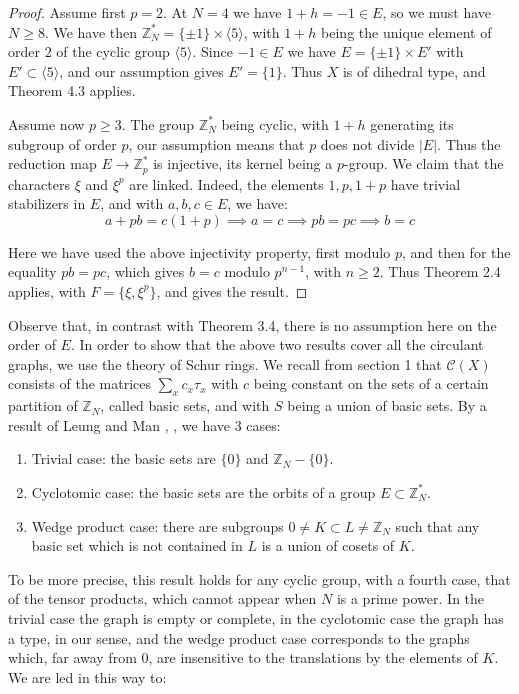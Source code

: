 \documentclass[11pt]{amsart}
\newcommand{\C}{\mathcal C}
\newcommand{\Z}{\mathbb Z}
\begin{document}
\begin{proof}
Assume first $p=2$. At $N=4$ we have $1+h=-1\in E$, so we must have $N\geq8$. We have then $\Z_N^*=\{\pm1\}\times\langle5\rangle$, with $1+h$ being the unique element of order $2$ of the cyclic group $\langle5\rangle$. Since $-1\in E$ we have $E=\{\pm1\}\times E'$ with $E'\subset\langle5\rangle$, and our assumption gives $E'=\{1\}$. Thus $X$ is of dihedral type, and Theorem 4.3 applies.

Assume now $p\geq3$. The group $\Z_N^*$ being cyclic, with $1+h$ generating its subgroup of order $p$, our assumption means that $p$ does not divide $|E|$. Thus the reduction map $E\to\Z_p^*$ is injective, its kernel being a $p$-group. We claim that the characters $\xi$ and $\xi^p$ are linked. Indeed, the elements $1,p,1+p$ have trivial stabilizers in $E$, and with $a,b,c\in E$, we have:
$$a+pb=c(1+p)\implies a=c\implies pb=pc\implies b=c$$

Here we have used the above injectivity property, first modulo $p$, and then for the equality $pb=pc$, which gives $b=c$ modulo $p^{n-1}$, with $n\geq2$. Thus Theorem 2.4 applies, with $F=\{\xi,\xi^p\}$, and gives the result.
\end{proof}

Observe that, in contrast with Theorem 3.4, there is no assumption here on the order of $E$. In order to show that the above two results cover all the circulant graphs, we use the theory of Schur rings. We recall from section 1 that $\C(X)$ consists of the matrices $\sum_xc_x\tau_x$ with $c$ being constant on the sets of a certain partition of $\Z_N$, called basic sets, and with $S$ being a union of basic sets. By a result of Leung and Man \cite{lm1}, \cite{lm2}, we have 3 cases:
\begin{enumerate}
\item Trivial case: the basic sets are $\{0\}$ and $\Z_N-\{0\}$.
\item Cyclotomic case: the basic sets are the orbits of a group $E\subset\Z_N^*$.
\item Wedge product case: there are subgroups $0\neq K\subset L\neq\Z_N$ such that any basic set which is not contained in $L$ is a union of cosets of $K$.
\end{enumerate}

To be more precise, this result holds for any cyclic group, with a fourth case, that of the tensor products, which cannot appear when $N$ is a prime power. In the trivial case the graph is empty or complete, in the cyclotomic case the graph has a type, in our sense, and the wedge product case corresponds to the graphs which, far away from $0$, are insensitive to the translations by the elements of $K$. We are led in this way to:
\end{document}
